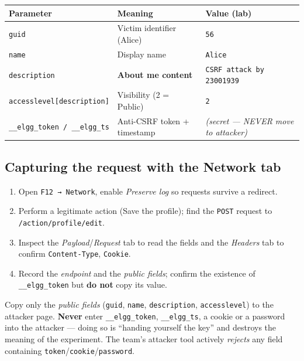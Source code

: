 \documentclass[11pt,a4paper]{article}
\begin{document}
\begin{center}\small
\begin{tabularx}{\linewidth}{@{}l Y l@{}}
\toprule
\textbf{Parameter} & \textbf{Meaning} & \textbf{Value (lab)}\\
\midrule
\texttt{guid} & Victim identifier (Alice) & \texttt{56}\\
\texttt{name} & Display name & \texttt{Alice}\\
\texttt{description} & \textbf{About me content} & \texttt{CSRF attack by 23001939}\\
\texttt{accesslevel[description]} & Visibility (2 = Public) & \texttt{2}\\
\texttt{\_\_elgg\_token / \_\_elgg\_ts} & Anti-CSRF token + timestamp & \emph{(secret — NEVER move to attacker)}\\
\bottomrule
\end{tabularx}
\end{center}

\subsection{Capturing the request with the Network tab}
\begin{enumerate}
  \item Open \texttt{F12 → Network}, enable \emph{Preserve log} so requests survive a redirect.
  \item Perform a legitimate action (Save the profile); find the \texttt{POST} request to \texttt{/action/profile/edit}.
  \item Inspect the \emph{Payload}/\emph{Request} tab to read the fields and the \emph{Headers} tab to confirm \texttt{Content-Type}, \texttt{Cookie}.
  \item Record the \emph{endpoint} and the \emph{public fields}; confirm the existence of \texttt{\_\_elgg\_token} but \textbf{do not} copy its value.
\end{enumerate}

\begin{warnbox}
Copy only the \emph{public fields} (\texttt{guid}, \texttt{name}, \texttt{description}, \texttt{accesslevel}) to the attacker page. \textbf{Never} enter \texttt{\_\_elgg\_token}, \texttt{\_\_elgg\_ts}, a cookie or a password into the attacker — doing so is ``handing yourself the key'' and destroys the meaning of the experiment. The team's attacker tool actively \emph{rejects} any field containing \texttt{token}/\texttt{cookie}/\texttt{password}.
\end{warnbox}
\end{document}
